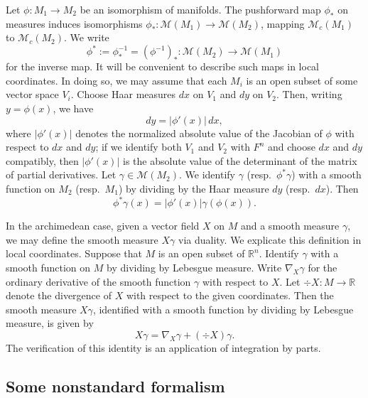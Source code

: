 Let $\phi : M_1 \rightarrow M_2$ be an isomorphism of manifolds.  The pushforward map $\phi_*$ on measures induces isomorphisms $\phi_* : \mathcal{M}(M_1) \rightarrow \mathcal{M}(M_2)$, mapping $\mathcal{M}_c(M_1)$ to $\mathcal{M}_c(M_2)$.  We write
\begin{equation*}
  \phi^* := \phi_*^{-1} = (\phi^{-1})_* : \mathcal{M}(M_2) \rightarrow \mathcal{M}(M_1)
\end{equation*}
for the inverse map.  It will be convenient to describe such maps in local coordinates.  In doing so, we may assume that each $M_i$ is an open subset of some vector space $V_i$.  Choose Haar measures $d x$ on $V_1$ and $d y$ on $V_2$.  Then, writing $y = \phi(x)$, we have
\begin{equation*}
  d y = |\phi '(x)| \, d x,
\end{equation*}
where $|\phi '(x)|$ denotes the normalized absolute value of the Jacobian of $\phi$ with respect to $d x$ and $d y$; if we identify both $V_1$ and $V_2$ with $F^n$ and choose $d x$ and $d y$ compatibly, then $|\phi '(x)|$ is the absolute value of the determinant of the matrix of partial derivatives.  Let $\gamma \in \mathcal{M}(M_2)$.  We identify $\gamma$ (resp.\ $\phi^* \gamma$) with a smooth function on $M_2$ (resp.\ $M_1$) by dividing by the Haar measure $d y$ (resp.\ $d x$).  Then
\begin{equation}\label{eq:phi-gammax-=jacobian}
  \phi^* \gamma(x) = |\phi '(x)| \gamma(\phi(x)).
\end{equation}

In the archimedean case, given a vector field $X$ on $M$ and a smooth measure $\gamma$, we may define the smooth measure $X \gamma$ via duality.  We explicate this definition in local coordinates.  Suppose that $M$ is an open subset of $\mathbb{R}^n$.  Identify $\gamma$ with a smooth function on $M$ by dividing by Lebesgue measure.  Write $\nabla_X \gamma$ for the ordinary derivative of the smooth function $\gamma$ with respect to $X$.  Let $\div X : M \rightarrow \mathbb{R}$ denote the divergence of $X$ with respect to the given coordinates.  Then the smooth measure $X \gamma$, identified with a smooth function by dividing by Lebesgue measure, is given by
\begin{equation*}
  X \gamma = \nabla_X \gamma + (\div X) \gamma.
\end{equation*}
The verification of this identity is an application of integration by parts.

\subsection{Some nonstandard formalism}

